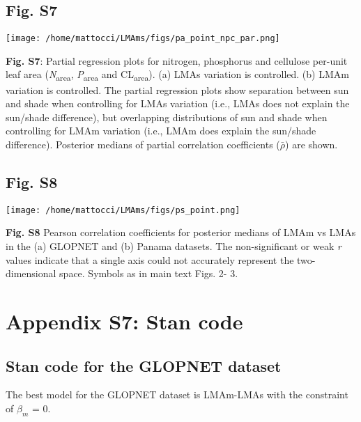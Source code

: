 \documentclass[
  12pt,
  letterpaper,
  DIV=11,
  numbers=noendperiod]{scrartcl}
\begin{document}
\newpage

\hypertarget{fig.-s7}{%
\subsection{Fig. S7}\label{fig.-s7}}

\texttt{[image: /home/mattocci/LMAms/figs/pa\_point\_npc\_par.png]}

\textbf{Fig. S7}: Partial regression plots for nitrogen, phosphorus and
cellulose per-unit leaf area (\emph{N}\textsubscript{area},
\emph{P}\textsubscript{area} and CL\textsubscript{area}). (a) LMAs
variation is controlled. (b) LMAm variation is controlled. The partial
regression plots show separation between sun and shade when controlling
for LMAs variation (i.e., LMAs does not explain the sun/shade
difference), but overlapping distributions of sun and shade when
controlling for LMAm variation (i.e., LMAm does explain the sun/shade
difference). Posterior medians of partial correlation coefficients
(\(\bar{\rho}\)) are shown.

\newpage

\hypertarget{fig.-s8}{%
\subsection{Fig. S8}\label{fig.-s8}}

\texttt{[image: /home/mattocci/LMAms/figs/ps\_point.png]}

\textbf{Fig. S8} Pearson correlation coefficients for posterior medians
of LMAm vs LMAs in the (a) GLOPNET and (b) Panama datasets. The
non-significant or weak \emph{r} values indicate that a single axis
could not accurately represent the two-dimensional space. Symbols as in
main text Figs. 2- 3.

\newpage

\hypertarget{appendix-s7-stan-code}{%
\section{Appendix S7: Stan code}\label{appendix-s7-stan-code}}

\hypertarget{stan-code-for-the-glopnet-dataset}{%
\subsection{Stan code for the GLOPNET
dataset}\label{stan-code-for-the-glopnet-dataset}}

The best model for the GLOPNET dataset is LMAm-LMAs with the constraint
of \(\beta_m\) = 0.
\end{document}
